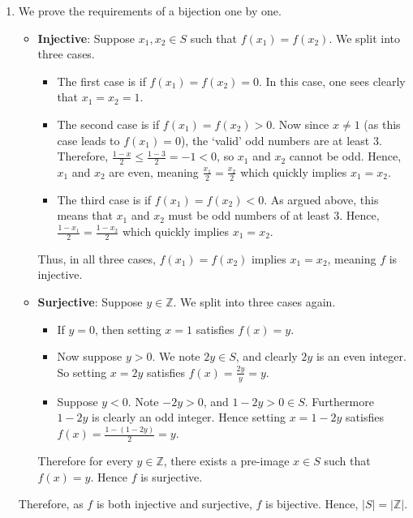 \begin{enumerate}
    \item We prove the requirements of a bijection one by one.
    \begin{itemize}
        \item \textbf{Injective}: Suppose $x_1, x_2 \in S$ such that $f(x_1) = f(x_2)$. We split into three cases.
        \begin{itemize}
            \item The first case is if $f(x_1) = f(x_2) = 0$. In this case, one sees clearly that $x_1 = x_2 = 1$.
            \item The second case is if $f(x_1) = f(x_2) > 0$. Now since $x \neq 1$ (as this case leads to $f(x_1) = 0$), the `valid' odd numbers are at least 3. Therefore, $\frac{1-x}{2} \leq \frac{1-3}{2} = -1 < 0$, so $x_1$ and $x_2$ cannot be odd. Hence, $x_1$ and $x_2$ are even, meaning $\frac{x_1}{2} = \frac{x_2}{2}$ which quickly implies $x_1 = x_2$.
            \item The third case is if $f(x_1) = f(x_2) < 0$. As argued above, this means that $x_1$ and $x_2$ must be odd numbers of at least 3. Hence, $\frac{1-x_1}{2} = \frac{1-x_2}{2}$ which quickly implies $x_1 = x_2$.
        \end{itemize}
        Thus, in all three cases, $f(x_1) = f(x_2)$ implies $x_1 = x_2$, meaning $f$ is injective.
        \item \textbf{Surjective}: Suppose $y \in \mathbb{Z}$. We split into three cases again.
        \begin{itemize}
            \item If $y = 0$, then setting $x = 1$ satisfies $f(x) = y$.
            \item Now suppose $y > 0$. We note $2y \in S$, and clearly $2y$ is an even integer. So setting $x = 2y$ satisfies $f(x) = \frac{2y}{y} = y$.
            \item Suppose $y < 0$. Note $-2y > 0$, and $1 - 2y > 0 \in S$. Furthermore $1 - 2y$ is clearly an odd integer. Hence setting $x = 1 - 2y$ satisfies $f(x) = \frac{1-(1-2y)}{2} = y$.
        \end{itemize}
        Therefore for every $y \in \mathbb{Z}$, there exists a pre-image $x \in S$ such that $f(x) = y$. Hence $f$ is surjective.
    \end{itemize}
    Therefore, as $f$ is both injective and surjective, $f$ is bijective. Hence, $|S| = |\mathbb{Z}|$.
\end{enumerate}


